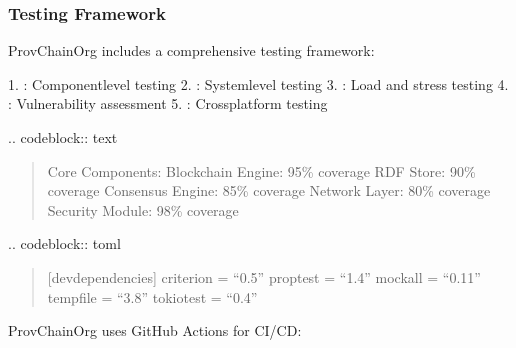 \documentclass[letterpaper,10pt,english]{sphinxmanual}
\begin{document}
\subsubsection{Testing Framework}
\label{\detokenize{research/technical-specifications:testing-framework}}
\sphinxAtStartPar
ProvChainOrg includes a comprehensive testing framework:

\sphinxAtStartPar
{}
1. : Component\sphinxhyphen{}level testing
2. : System\sphinxhyphen{}level testing
3. : Load and stress testing
4. : Vulnerability assessment
5. : Cross\sphinxhyphen{}platform testing

\sphinxAtStartPar
{}
.. code\sphinxhyphen{}block:: text
\begin{quote}

\sphinxAtStartPar
Core Components:
\sphinxhyphen{} Blockchain Engine: 95\% coverage
\sphinxhyphen{} RDF Store: 90\% coverage
\sphinxhyphen{} Consensus Engine: 85\% coverage
\sphinxhyphen{} Network Layer: 80\% coverage
\sphinxhyphen{} Security Module: 98\% coverage
\end{quote}

\sphinxAtStartPar
{}
.. code\sphinxhyphen{}block:: toml
\begin{quote}

\sphinxAtStartPar
{[}dev\sphinxhyphen{}dependencies{]}
criterion = “0.5”
proptest = “1.4”
mockall = “0.11”
tempfile = “3.8”
tokio\sphinxhyphen{}test = “0.4”
\end{quote}

\sphinxAtStartPar
{}
ProvChainOrg uses GitHub Actions for CI/CD:
\end{document}
